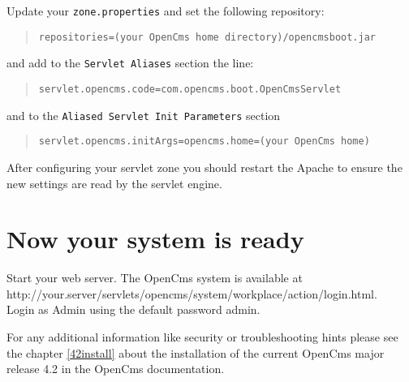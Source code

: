 Update your \texttt{zone.properties} and set the following repository: 

\begin{quote}
\begin{verbatim}
repositories=(your OpenCms home directory)/opencmsboot.jar
\end{verbatim}
\end{quote}

and add to the \texttt{Servlet Aliases} section the line: 

\begin{quote}
\texttt{servlet.opencms.code=com.opencms.boot.OpenCmsServlet} 
\end{quote}

and to the \texttt{Aliased Servlet Init Parameters} section 

\begin{quote}
\texttt{servlet.opencms.initArgs=opencms.home=(your OpenCms home) }
\end{quote}

After configuring your servlet zone you should restart the Apache to
ensure the new settings are read by the servlet engine.

\section{Now your system is ready}

Start your web server. The OpenCms system is available at\\
http://your.server/servlets/opencms/system/workplace/action/login.html.\\
Login as Admin using the default password admin. 

For any additional information like security or troubleshooting hints
please see the chapter \ref{42install} about the installation of the current OpenCms
major release 4.2 in the OpenCms documentation.

